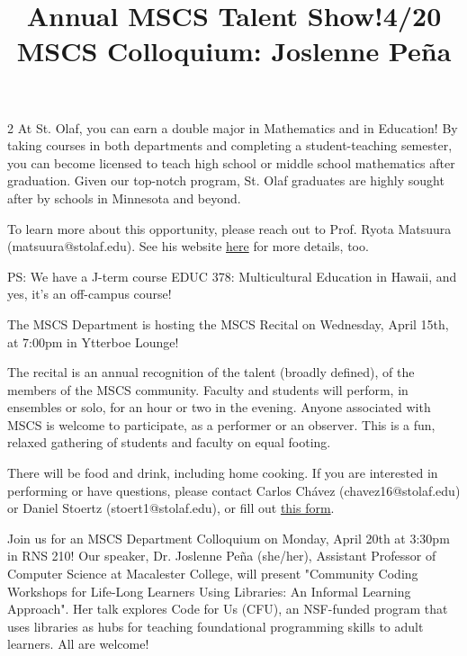 \documentclass[12pt]{article}
\newcommand{\bolder}{\textbf}
\begin{document}
\begin{multicols}{2}
At St. Olaf, you can earn a double major in Mathematics and in Education! By taking courses in both departments and completing a student-teaching semester, you can become licensed to teach high school or middle school mathematics after graduation. Given our top-notch program, St. Olaf graduates are highly sought after by schools in Minnesota and beyond.

To learn more about this opportunity, please reach out to Prof. Ryota Matsuura (matsuura@stolaf.edu). See his website \href{https://pages.stolaf.edu/matsuura/math-ed-st-olaf/}{here} for more details, too.

PS: We have a J-term course EDUC 378: Multicultural Education in Hawaii, and yes, it’s an off-campus course!

 \begin{tcolorbox}[colback=white, colframe=black]
    \begin{center}
    \title{{\large \bolder{Annual MSCS Talent Show!}}}
    \end{center}
\end{tcolorbox}
The MSCS Department is hosting the MSCS Recital on Wednesday, April 15th, at 7:00pm in Ytterboe Lounge!

The recital is an annual recognition of the talent (broadly defined), of the members of the MSCS community. Faculty and students will perform, in ensembles or solo, for an hour or two in the evening. Anyone associated with MSCS is welcome to participate, as a performer or an observer. This is a fun, relaxed gathering of students and faculty on equal footing. 

There will be food and drink, including home cooking. If you are interested in performing or have questions, please contact Carlos Chávez (chavez16@stolaf.edu) or Daniel Stoertz (stoert1@stolaf.edu), or fill out \href{https://docs.google.com/forms/d/e/1FAIpQLSctO8sAXxTCjrrDK_F1ocOHFMjC1OTzejShYgvfoWYQjHmg1g/viewform?usp=publish-editor}{this form}.


\begin{tcolorbox}[colback=white, colframe=black]
    \begin{center}
    \title{{\large \bolder{4/20 MSCS Colloquium: Joslenne Peña}}}
    \end{center}
\end{tcolorbox}

Join us for an MSCS Department Colloquium on Monday, April 20th at 3:30pm in RNS 210! Our speaker, Dr. Joslenne Peña (she/her), Assistant Professor of Computer Science at Macalester College, will present "Community Coding Workshops for Life-Long Learners Using Libraries: An Informal Learning Approach". Her talk explores Code for Us (CFU), an NSF-funded program that uses libraries as hubs for teaching foundational programming skills to adult learners. All are welcome!



\end{multicols}
\end{document}
